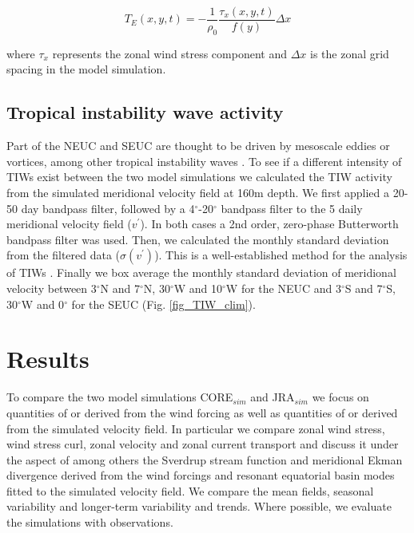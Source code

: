 \documentclass[os, manuscript]{copernicus}
\begin{document}
\begin{equation}
	T_E(x,y,t) = - \frac{1}{\rho_0}\frac{\tau_x(x,y,t)}{f(y)}\Delta x
	\label{equ_Ekman}
\end{equation}

where $\tau_x$ represents the zonal wind stress component and $\Delta x$ is the zonal grid spacing in the model simulation.

\subsection{Tropical instability wave activity}
Part of the NEUC and SEUC are thought to be driven by mesoscale eddies or vortices, among other tropical instability waves \citep[TIWs, e.g. ][]{Jochum2004b,Assene2020}. To see if a different intensity of TIWs exist between the two model simulations we calculated the TIW activity from the simulated meridional velocity field at 160m depth. We first applied a 20-50 day bandpass filter, followed by a 4$^{\circ}$-20$^{\circ}$ bandpass filter to the 5 daily meridional velocity field ($ v^\prime $). In both cases a 2nd order, zero-phase Butterworth bandpass filter was used. Then, we calculated the monthly standard deviation from the filtered data ($ \sigma(v^\prime) $). This is a well-established method for the analysis of TIWs \citep{Lee2014, Olivier2020,Perez2012,Tuchen2022a}. Finally we box average the monthly standard deviation of meridional velocity between 3$^{\circ}$N and 7$^{\circ}$N, 30$^{\circ}$W and 10$^{\circ}$W for the NEUC and 3$^{\circ}$S and 7$^{\circ}$S, 30$^{\circ}$W and 0$^{\circ}$ for the SEUC (Fig. \ref{fig_TIW_clim}). 

\section{Results}
To compare the two model simulations CORE$_{sim}$ and JRA$_{sim}$ we  focus on quantities of or derived from the wind forcing as well as quantities of or derived from the simulated velocity field. In particular we  compare zonal wind stress, wind stress curl, zonal velocity and zonal current transport and discuss it under the aspect of among others the Sverdrup stream function and meridional Ekman divergence derived from the wind forcings and resonant equatorial basin modes fitted to the simulated velocity field. We  compare the mean fields, seasonal variability and longer-term variability and trends. Where possible, we  evaluate the simulations with observations.
\end{document}
